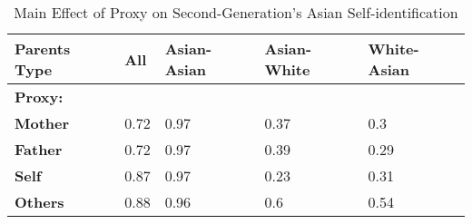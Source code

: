 \begin{table}[H]
\centering\centering
\caption{Main Effect of Proxy on Second-Generation's Asian Self-identification \label{tab:hispbyproxy}}
\centering
\fontsize{12}{14}\selectfont
\begin{tabular}[c]{>{}lllll}
\toprule
Parents Type & All & Asian-Asian & Asian-White & White-Asian\\
\midrule
\textbf{Proxy:} &  &  &  & \\
\hspace{1em}\textbf{Mother} & 0.72 & 0.97 & 0.37 & 0.3\\
\hspace{1em}\textbf{Father} & 0.72 & 0.97 & 0.39 & 0.29\\
\hspace{1em}\textbf{Self} & 0.87 & 0.97 & 0.23 & 0.31\\
\hspace{1em}\textbf{Others} & 0.88 & 0.96 & 0.6 & 0.54\\
\bottomrule
\end{tabular}
\end{table}
